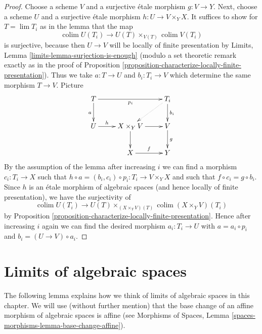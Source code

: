 \documentclass{stacks-project}
\theoremstyle{plain}
\theoremstyle{definition}
\theoremstyle{remark}
\numberwithin{equation}{subsection}
\def\lim{\mathop{\mathrm{lim}}\nolimits}
\def\colim{\mathop{\mathrm{colim}}\nolimits}
\begin{document}
\begin{proof}
Choose a scheme $V$ and a surjective \'etale morphism $g : V \to Y$.
Next, choose a scheme $U$ and a surjective \'etale morphism
$h : U \to V \times_Y X$. It suffices to show for $T = \lim T_i$
as in the lemma that the map
$$
\colim U(T_i) \longrightarrow U(T) \times_{V(T)} \colim V(T_i)
$$
is surjective, because then $U \to V$ will be locally of finite
presentation by Limits, Lemma \ref{limits-lemma-surjection-is-enough}
(modulo a set theoretic remark exactly as in the proof of
Proposition \ref{proposition-characterize-locally-finite-presentation}).
Thus we take $a : T \to U$ and $b_i : T_i \to V$ which determine
the same morphism $T \to V$. Picture
$$
\xymatrix{
T \ar[d]_a \ar[rr]_{p_i} & & T_i \ar[d]^{b_i} \ar@{..>}[ld] \\
U \ar[r]^-h & X \times_Y V \ar[d] \ar[r] & V \ar[d]^g \\
& X \ar[r]^f & Y
}
$$
By the assumption of the lemma after increasing $i$
we can find a morphism $c_i : T_i \to X$ such that
$h \circ a = (b_i, c_i) \circ p_i : T_i \to V \times_Y X$
and such that $f \circ c_i = g \circ b_i$.
Since $h$ is an \'etale morphism of algebraic spaces
(and hence locally of finite presentation), we have the surjectivity of
$$
\colim U(T_i) \longrightarrow U(T) \times_{(X \times_Y V)(T)}
\colim (X \times_Y V)(T_i)
$$
by Proposition \ref{proposition-characterize-locally-finite-presentation}.
Hence after increasing $i$ again we can find the desired
morphism $a_i : T_i \to U$ with $a = a_i \circ p_i$ and
$b_i = (U \to V) \circ a_i$.
\end{proof}















\section{Limits of algebraic spaces}
\label{section-limits}

\noindent
The following lemma explains how we think of limits of algebraic
spaces in this chapter. We will use (without further mention) that the
base change of an affine morphism of algebraic spaces is affine (see
Morphisms of Spaces, Lemma \ref{spaces-morphisms-lemma-base-change-affine}).
\end{document}
